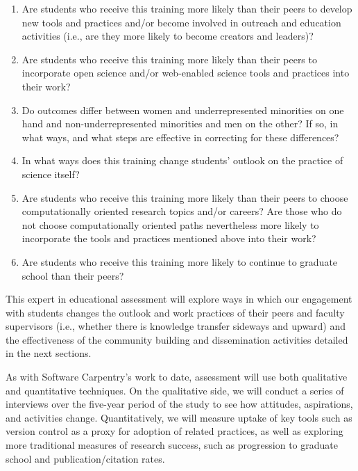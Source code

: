 \documentclass{proposalnsf}
\newlength{\up}
\begin{document}
\begin{enumerate}
\item
  Are students who receive this training more likely than their peers
  to develop new tools and practices and/or become involved in
  outreach and education activities (i.e., are they more likely to
  become creators and leaders)?

\item
  Are students who receive this training more likely than their peers
  to incorporate open science and/or web-enabled science tools and
  practices into their work?

\item
  Do outcomes differ between women and underrepresented minorities on
  one hand and non-underrepresented minorities and men on the other?
  If so, in what ways, and what steps are effective in correcting for
  these differences?

\item
  In what ways does this training change students' outlook on the
  practice of science itself?

\item
  Are students who receive this training more likely than their peers
  to choose computationally oriented research topics and/or careers?
  Are those who do not choose computationally oriented paths
  nevertheless more likely to incorporate the tools and practices
  mentioned above into their work?

\item
  Are students who receive this training more likely to continue to
  graduate school than their peers?

\end{enumerate}

This expert in educational assessment will explore ways in which our
engagement with students changes the outlook and work practices of
their peers and faculty supervisors (i.e., whether there is knowledge
transfer sideways and upward) and the effectiveness of the community
building and dissemination activities detailed in the next sections.

As with Software Carpentry's work to date,
assessment will use both qualitative and quantitative techniques.  On
the qualitative side, we will conduct a series of interviews over the
five-year period of the study to see how attitudes, aspirations, and
activities change. Quantitatively, we will measure uptake of key
tools such as version control as a proxy for adoption of related
practices, as well as exploring more traditional measures of research
success, such as progression to graduate school and
publication/citation rates. 
\end{document}

